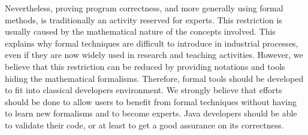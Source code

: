  Nevertheless, proving program correctness, and more generally using
formal methods, is traditionally an activity reserved for experts.  This restriction is usually caused by the
mathematical nature of the concepts involved.  This explains why formal techniques are difficult to introduce in
industrial processes, even if they are now widely used in research and teaching activities.  However, we believe
that this restriction can be reduced by providing notations and tools hiding the mathematical formalisms.
Therefore, formal tools should be developed to fit into classical developers environment.  We strongly believe
that efforts should be done to allow users to benefit from formal techniques without having to learn new
formalisms and to become experts. Java developers should be able to validate their code, or at least to get a
good assurance on its correctness.

